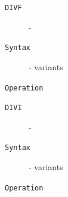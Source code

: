 \clearpage
\begin{description}
\item[\texttt{DIVF}]  - \\
\item[\texttt{Syntax}] - variants\\

\item[\texttt{Operation}]
\item[\texttt{}]
\end{description}
\clearpage
\begin{description}
\item[\texttt{DIVI}]  - \\
\item[\texttt{Syntax}] - variants\\

\item[\texttt{Operation}]
\item[\texttt{}]
\end{description}
\clearpage
